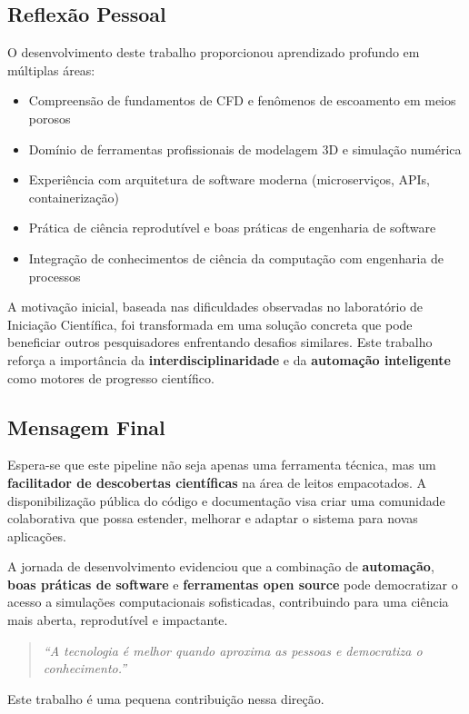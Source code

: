 \subsection{Reflexão Pessoal}

O desenvolvimento deste trabalho proporcionou aprendizado profundo em múltiplas áreas:

\begin{itemize}
    \item Compreensão de fundamentos de CFD e fenômenos de escoamento em meios porosos
    \item Domínio de ferramentas profissionais de modelagem 3D e simulação numérica
    \item Experiência com arquitetura de software moderna (microserviços, APIs, containerização)
    \item Prática de ciência reprodutível e boas práticas de engenharia de software
    \item Integração de conhecimentos de ciência da computação com engenharia de processos
\end{itemize}

A motivação inicial, baseada nas dificuldades observadas no laboratório de Iniciação Científica, foi transformada em uma solução concreta que pode beneficiar outros pesquisadores enfrentando desafios similares. Este trabalho reforça a importância da \textbf{interdisciplinaridade} e da \textbf{automação inteligente} como motores de progresso científico.

\subsection{Mensagem Final}

Espera-se que este pipeline não seja apenas uma ferramenta técnica, mas um \textbf{facilitador de descobertas científicas} na área de leitos empacotados. A disponibilização pública do código e documentação visa criar uma comunidade colaborativa que possa estender, melhorar e adaptar o sistema para novas aplicações.

A jornada de desenvolvimento evidenciou que a combinação de \textbf{automação}, \textbf{boas práticas de software} e \textbf{ferramentas open source} pode democratizar o acesso a simulações computacionais sofisticadas, contribuindo para uma ciência mais aberta, reprodutível e impactante.

\begin{quote}
\textit{``A tecnologia é melhor quando aproxima as pessoas e democratiza o conhecimento.''}
\end{quote}

Este trabalho é uma pequena contribuição nessa direção.

